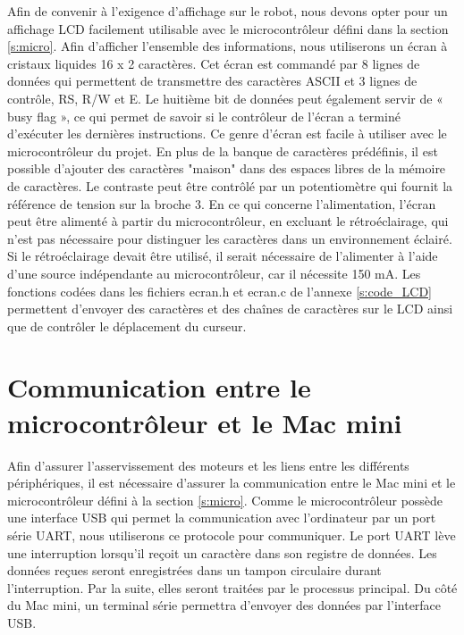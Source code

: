 Afin de convenir à l'exigence d'affichage sur le robot, nous devons opter pour un affichage LCD facilement utilisable avec le microcontrôleur défini dans la section \ref{s:micro}. Afin d'afficher l'ensemble des informations, nous utiliserons un écran à cristaux liquides 16 x 2  caractères. Cet écran est commandé par 8 lignes de données qui permettent de transmettre des caractères ASCII et 3 lignes de contrôle, RS, R/W et E. Le huitième bit de données peut également servir de « busy flag », ce qui permet de savoir si le contrôleur de l'écran a terminé d'exécuter les dernières instructions. Ce genre d'écran est facile à utiliser avec le microcontrôleur du projet. En plus de la banque de caractères prédéfinis, il est possible d'ajouter des caractères "maison" dans des espaces libres de la mémoire de caractères. Le contraste peut être contrôlé par un potentiomètre qui fournit la référence de tension sur la broche 3. En ce qui concerne l'alimentation, l'écran peut être alimenté à partir du microcontrôleur, en excluant le rétroéclairage, qui n'est pas nécessaire pour distinguer les caractères dans un environnement éclairé. Si le rétroéclairage devait être utilisé, il serait nécessaire de l'alimenter à l'aide d'une source indépendante au microcontrôleur, car il nécessite 150 mA. Les fonctions codées dans les fichiers ecran.h et ecran.c de l'annexe \ref{s:code_LCD} permettent d'envoyer des caractères et des chaînes de caractères sur le LCD ainsi que de contrôler le déplacement du curseur.

\section{Communication entre le microcontrôleur et le Mac mini} \label{s:comm_mac_micro}

Afin d'assurer l'asservissement des moteurs et les liens entre les différents périphériques, il est nécessaire d'assurer la communication entre le Mac mini et le microcontrôleur défini à la section \ref{s:micro}. Comme le microcontrôleur possède une interface USB qui permet la communication avec l'ordinateur par un port série UART, nous utiliserons ce protocole pour communiquer. Le port UART lève une interruption lorsqu'il reçoit un caractère dans son registre de données. Les données reçues seront enregistrées dans un tampon circulaire durant l'interruption. Par la suite, elles seront traitées par le processus principal. Du côté du Mac mini, un terminal série permettra d'envoyer des données par l'interface USB. 

